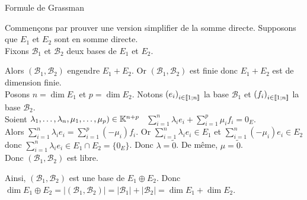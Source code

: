 \documentclass{article}
\renewenvironment{question_kholle}[2][ ]
{
	\subsection{\texorpdfstring{#2}{}}
	\notblank{#1}
	{
		\noindent #1
		\bigbreak
	}
	{}
	\begin{proof}
}
{
	\end{proof}
}
\begin{document}
	\begin{question_kholle}
		[Supposons $E$ de dimension finie. \\
		Soient $E_1$ et $E_2$ deux \sevs. Alors $E_1 + E_2$ est de dimension finie et
		\begin{equation}
			\dim E_1 + E_2 = \dim E_1 + \dim E_2 - \dim E_1 \cap E_2
		\end{equation}]
		{Formule de Grassman}
		
		Commençons par prouver une version simplifier de la somme directe. Supposons que $E_1$ et $E_2$ sont en somme directe. \\
		Fixons $\mathcal{B}_1$ et $\mathcal{B}_2$ deux bases de $E_1$ et $E_2$.
		
		Alors $\left(\mathcal{B}_1, \mathcal{B}_2\right)$ engendre $E_1 + E_2$. Or $\left(\mathcal{B}_1, \mathcal{B}_2\right)$ est finie donc $E_1 + E_2$ est de dimension finie. \\
		Posons $n = \dim E_1$ et $p = \dim E_2$. Notons $\left(e_i\right)_{i \in [\![ 1 ; n ]\!]}$ la base $\mathcal{B}_1$ et $\left(f_i\right)_{i \in [\![ 1 ; n ]\!]}$ la base $\mathcal{B}_2$. \\
		Soient $\lambda_1, \ldots, \lambda_n, \mu_1, \ldots, \mu_p) \in \mathbb K^{n+p}$ \fqs \fqs \ $\displaystyle \sum_{i=1}^{n} \lambda_i e_i + \sum_{i=1}^{p} \mu_i f_i = 0_E$. \\
		Alors $\sum_{i=1}^{n} \lambda_i e_i = \sum_{i=1}^{p} (-\mu_i) f_i$.
		Or $\sum_{i=1}^{n} \lambda_i e_i \in E_1$ et $\sum_{i=1}^{n} (-\mu_i) e_i \in E_2$ donc $\sum_{i=1}^{n} \lambda_i e_i \in E_1 \cap E_2 = \{0_E\}$.
		Donc $\lambda = \tilde{0}$. De même, $\mu = \tilde{0}$. \\
		Donc $\left(\mathcal{B}_1, \mathcal{B}_2\right)$ est libre.
		
		Ainsi, $\left(\mathcal{B}_1, \mathcal{B}_2\right)$ est une base de $E_1 \oplus E_2$.
		Donc $ \dim E_1 \oplus E_2 = |(\mathcal{B}_1, \mathcal{B}_2)| = |\mathcal{B}_1| + |\mathcal{B}_2| = \dim E_1 + \dim E_2$. \\
		

\end{question_kholle}
\end{document}
